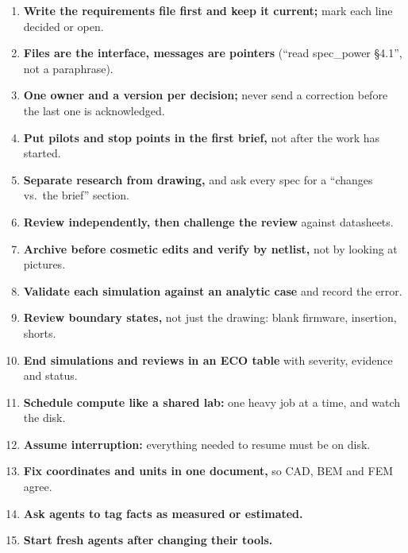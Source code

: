 \begin{enumerate}[label=\textbf{R\arabic*.},leftmargin=2.4em,itemsep=1pt]
  \item \textbf{Write the requirements file first and keep it current;} mark each line decided or open.
  \item \textbf{Files are the interface, messages are pointers} (``read spec\_power §4.1'', not a paraphrase).
  \item \textbf{One owner and a version per decision;} never send a correction before the last one is acknowledged.
  \item \textbf{Put pilots and stop points in the first brief,} not after the work has started.
  \item \textbf{Separate research from drawing,} and ask every spec for a ``changes vs.\ the brief'' section.
  \item \textbf{Review independently, then challenge the review} against datasheets.
  \item \textbf{Archive before cosmetic edits and verify by netlist,} not by looking at pictures.
  \item \textbf{Validate each simulation against an analytic case} and record the error.
  \item \textbf{Review boundary states,} not just the drawing: blank firmware, insertion, shorts.
  \item \textbf{End simulations and reviews in an ECO table} with severity, evidence and status.
  \item \textbf{Schedule compute like a shared lab:} one heavy job at a time, and watch the disk.
  \item \textbf{Assume interruption:} everything needed to resume must be on disk.
  \item \textbf{Fix coordinates and units in one document,} so CAD, BEM and FEM agree.
  \item \textbf{Ask agents to tag facts as measured or estimated.}
  \item \textbf{Start fresh agents after changing their tools.}
\end{enumerate}
